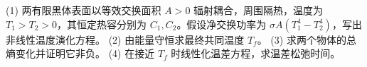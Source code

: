 (1) 两有限黑体表面以等效交换面积 \(A>0\) 辐射耦合，周围隔热，温度为 \(T_1>T_2>0\)，其恒定热容分别为 \(C_1,C_2\)。假设净交换功率为 \(\sigma A(T_1^4-T_2^4)\)，写出非线性温度演化方程。
(2) 由能量守恒求最终共同温度 \(T_f\)。
(3) 求两个物体的总熵变化并证明它非负。
(4) 在接近 \(T_f\) 时线性化温差方程，求温差松弛时间。
